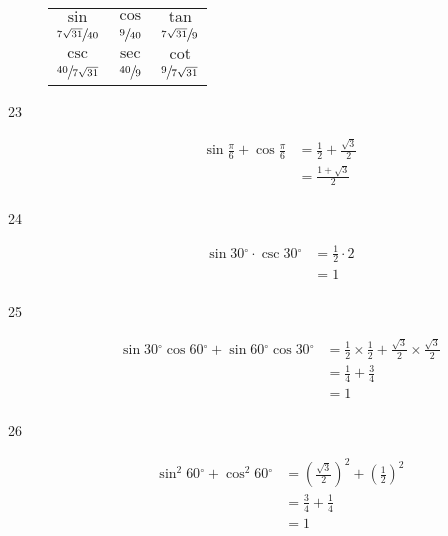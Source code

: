\documentclass{exam}
\newcommand{\dg}{\ensuremath{^\circ}}
\begin{document}
\begin{description}
        \begin{tabular}[H]{ccc}
          \toprule
          $\sin$                    & $\cos$          & $\tan$                   \\
          $\sfrac{7 \sqrt{31}}{40}$ & $\sfrac{9}{40}$ & $\sfrac{7 \sqrt{31}}{9}$ \\

          \midrule

          $\csc$                    & $\sec$          & $\cot$ \\
          $\sfrac{40}{7 \sqrt{31}}$ & $\sfrac{40}{9}$ & $\sfrac{9}{7 \sqrt{31}}$ \\

          \bottomrule
        \end{tabular}

      \item[23]
        \begin{align*}
          \sin \frac{\pi}{6} + \cos \frac{\pi}{6} & = \frac{1}{2} + \frac{\sqrt{3}}{2} \\
                                                  & = \boxed{ \frac{1 + \sqrt{3}}{2} } \\
        \end{align*}

      \item[24]
        \begin{align*}
          \sin 30 \dg \cdot \csc 30 \dg & = \frac{1}{2} \cdot 2 \\
                                        & = \boxed{ 1 } \\
        \end{align*}

      \item[25]
        \begin{align*}
          \sin 30 \dg \cos 60 \dg + \sin 60 \dg \cos 30 \dg & =
            \frac{1}{2} \times \frac{1}{2} + \frac{\sqrt{3}}{2} \times \frac{\sqrt{3}}{2} \\
          & = \frac{1}{4} + \frac{3}{4} \\
          &= \boxed{ 1 } \\
        \end{align*}

      \item[26]
        \begin{align*}
          \sin^2 60 \dg + \cos^2 60 \dg & = \left( \frac{\sqrt{3}}{2} \right)^2 + \left( \frac{1}{2} \right)^2 \\
                                        & = \frac{3}{4} + \frac{1}{4} \\
                                        & = \boxed{ 1 } \\
        \end{align*}


\end{description}
\end{document}
